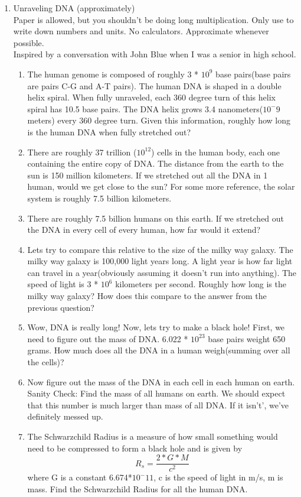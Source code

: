 \documentclass{article}
\begin{document}
\begin{enumerate}
    \item Unraveling DNA (approximately)\\
    Paper is allowed, but you shouldn't be doing long multiplication. Only use to write down numbers and units. No calculators. Approximate whenever possible.\\
    Inspired by a conversation with John Blue when I was a senior in high school.
    \begin{enumerate}
        \item The human genome is composed of roughly 3 * $10^9$ base pairs(base pairs are pairs C-G and A-T pairs). The human DNA is shaped in a double helix spiral. When fully unraveled, each 360 degree turn of this helix spiral has 10.5 base pairs. The DNA helix grows 3.4 nanometers($10^-9$ meters) every 360 degree turn. Given this information, roughly how long is the human DNA when fully stretched out?
        \item There are roughly 37 trillion ($10^12$) cells in the human body, each one containing the entire copy of DNA. The distance from the earth to the sun is 150 million kilometers. If we stretched out all the DNA in 1 human, would we get close to the sun? For some more reference, the solar system is roughly 7.5 billion kilometers. 
        \item There are roughly 7.5 billion humans on this earth. If we stretched out the DNA in every cell of every human, how far would it extend?
        \item Lets try to compare this relative to the size of the milky way galaxy. The milky way galaxy is 100,000 light years long. A light year is how far light can travel in a year(obviously assuming it doesn't run into anything). The speed of light is 3 * $10^6$ kilometers per second. Roughly how long is the milky way galaxy? How does this compare to the answer from the previous question?
        \item Wow, DNA is really long! Now, lets try to make a black hole! First, we need to figure out the mass of DNA. 6.022 * $10^23$ base pairs weight 650 grams. How much does all the DNA in a human weigh(summing over all the cells)?
        \item Now figure out the mass of the DNA in each cell in each human on earth.
        \indent Sanity Check: Find the mass of all humans on earth. We should expect that this number is much larger than mass of all DNA. If it isn't', we've definitely messed up.
        \item The Schwarzchild Radius is a measure of how small something would need to be compressed to form a black hole and is given by
        \[ R_s = \frac{2*G*M}{c^2}  \]
        where G is a constant 6.674*$10^-11$, c is the speed of light in m/s, m is mass. Find the Schwarzchild Radius for all the human DNA.
    \end{enumerate}


\end{enumerate}
\end{document}
